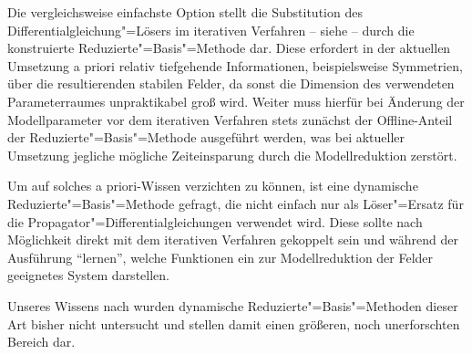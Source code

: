 \documentclass[../main.tex]{subfiles}
\begin{document}
Die vergleichsweise einfachste Option stellt die Substitution des Differentialgleichung"=Lösers im iterativen Verfahren  -- siehe  -- durch die konstruierte Reduzierte"=Basis"=Methode dar.
Diese erfordert in der aktuellen Umsetzung a priori relativ tiefgehende Informationen, beispielsweise Symmetrien, über die resultierenden stabilen Felder, da sonst die Dimension des verwendeten Parameterraumes unpraktikabel groß wird.
Weiter muss hierfür bei Änderung der Modellparameter vor dem iterativen Verfahren stets zunächst der Offline-Anteil der Reduzierte"=Basis"=Methode ausgeführt werden, was bei aktueller Umsetzung jegliche mögliche Zeiteinsparung durch die Modellreduktion zerstört.

Um auf solches a priori-Wissen verzichten zu können, ist eine dynamische Reduzierte"=Basis"=Methode gefragt, die nicht einfach nur als Löser"=Ersatz für die Propagator"=Differentialgleichungen verwendet wird.
Diese sollte nach Möglichkeit direkt mit dem iterativen Verfahren gekoppelt sein und während der Ausführung \enquote{lernen}, welche Funktionen ein zur Modellreduktion der Felder geeignetes System darstellen.

Unseres Wissens nach wurden dynamische Reduzierte"=Basis"=Methoden dieser Art bisher nicht untersucht und stellen damit einen größeren, noch unerforschten Bereich dar.
\end{document}
